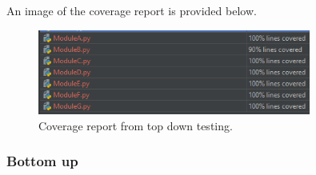 \documentclass[12pt, letterpaper, titlepage]{article}
\begin{document}
An image of the coverage report is provided below.
\begin{figure}[H]
    \centering
    \includegraphics[width=0.8\textwidth]{Coverage1}
    \caption{Coverage report from top down testing.}
\end{figure}

\subsubsection*{Bottom up}
\footnotesize
\end{document}
